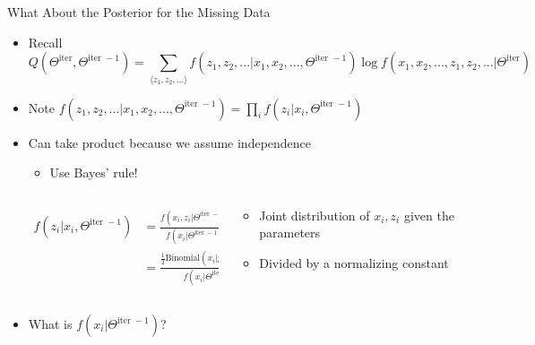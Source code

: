 \documentclass[aspectratio=169]{beamer}
\begin{document}
\begin{frame}{What About the Posterior for the Missing Data}

\begin{itemize}
\item Recall
		$$Q(\Theta^{\textrm{iter}}, \Theta^{\textrm{iter }-1}) =
			\sum_{\langle z_1, z_2, ... \rangle} f (z_1, z_2, ... | x_1,  x_2, ..., \Theta^{\textrm{iter }-1}) 
				\log f (x_1, x_2, ..., z_1, z_2, ... | \Theta^{\textrm{iter}})$$

\item Note $f (z_1, z_2, ... | x_1,  x_2, ..., \Theta^{\textrm{iter }-1}) = \prod_i f (z_i | x_i, \Theta^{\textrm{iter }-1})$
\item Can take product because we assume independence
	\begin{itemize}
	\item Use Bayes' rule!
	\end{itemize}
\begin{columns}[T]
\begin{column}{0.5\textwidth}
	\begin{align}
	f (z_i | x_i, \Theta^{\textrm{iter }-1}) &= 
		\frac{f (x_i, z_i | \Theta^{\textrm{iter }-1})}
		{f (x_i | \Theta^{\textrm{iter }-1})} \nonumber \\
	&= \frac{\frac{1}{2} \textrm {Binomial}(x_i | p_{z_i}^{\textrm{iter }-1}, 10)}
		{f (x_i | \Theta^{\textrm{iter }-1})} \nonumber
	\end{align}
\end{column}
\begin{column}{0.5\textwidth}
	\begin{itemize}
	\item Joint distribution of $x_i, z_i$ given the parameters
	\item Divided by a normalizing constant
	\end{itemize}
\end{column}
\end{columns}
	\item What is $f (x_i | \Theta^{\textrm{iter }-1})$?
	\end{itemize}
	
\end{frame}
\end{document}

